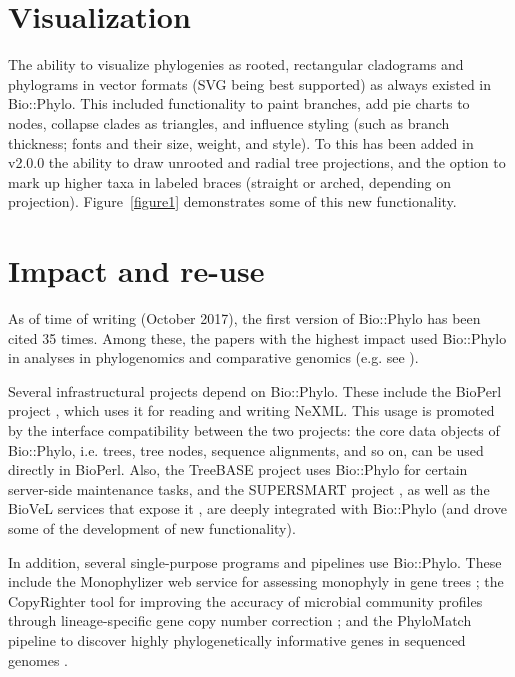 \documentclass{bioinfo}
\begin{document}
\section{Visualization}

The ability to visualize phylogenies as rooted, rectangular cladograms and phylograms in
vector formats (SVG being best supported) as always existed in Bio::Phylo. This included
functionality to paint branches, add pie charts to nodes, collapse clades as triangles,
and influence styling (such as branch thickness; fonts and their size, weight, and style).
To this has been added in v2.0.0 the ability to draw unrooted and radial tree projections,
and the option to mark up higher taxa in labeled braces (straight or arched, depending on 
projection). Figure~\ref{figure1} demonstrates some of this new functionality.

\section{Impact and re-use}

As of time of writing (October 2017), the first version of Bio::Phylo has been cited 35
times. Among these, the papers with the highest impact used Bio::Phylo in analyses in
phylogenomics and comparative genomics (e.g. see \citet{Roure2012,Hayward2013,Smet2013}).

Several infrastructural projects depend on Bio::Phylo. These include the BioPerl project 
\citep{Stajich2002}, which uses it for reading and writing NeXML. This usage is promoted
by the interface compatibility between the two projects: the core data objects of 
Bio::Phylo, i.e. trees, tree nodes, sequence alignments, and so on, can be used directly
in BioPerl. Also, the TreeBASE project \citep{Piel2009} uses Bio::Phylo for certain
server-side maintenance tasks, and the SUPERSMART project \citep{Antonelli2017}, as well
as the BioVeL services that expose it \citep{Hardisty2016}, are deeply integrated with 
Bio::Phylo (and drove some of the development of new functionality). 

In addition, several single-purpose programs and pipelines use Bio::Phylo. These include
the Monophylizer web service for assessing monophyly in gene trees 
\citep{Mutanen2016,Mutanen2016a}; the CopyRighter tool for improving the accuracy of 
microbial community profiles through lineage-specific gene copy number correction
\citep{Angly2014}; and the PhyloMatch pipeline to discover highly phylogenetically 
informative genes in sequenced genomes \citep{Ramazzotti2012}.
\end{document}
